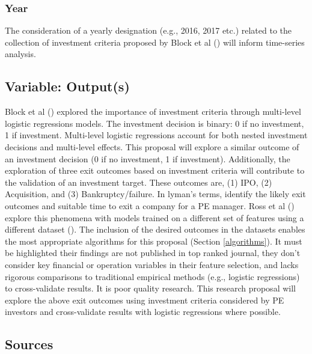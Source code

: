 \documentclass[12pt]{article}
\begin{document}
\subsubsection{Year}
The consideration of a yearly designation (e.g., 2016, 2017 etc.) related to the collection of investment criteria proposed by Block et al (\citeyear{BLOCK2019329}) will inform time-series analysis.
\subsection{Variable: Output(s)}
Block et al (\citeyear{BLOCK2019329}) explored the importance of investment criteria through multi-level logistic regressions models.
The investment decision is binary: 0 if no investment, 1 if investment. Multi-level logistic regressions account for both nested investment decisions and multi-level effects.
This proposal will explore a similar outcome of an investment decision (0 if no investment, 1 if investment).
Additionally, the exploration of three exit outcomes based on investment criteria will contribute to the validation of an investment target.
These outcomes are, (1) IPO, (2) Acquisition, and (3) Bankruptcy/failure.
In lyman's terms, identify the likely exit outcomes and suitable time to exit a company for a PE manager.
Ross et al (\citeyear{ross2021capitalvx}) explore this phenomena with models trained on a different set of features using a different dataset (\cite{CB}).
The inclusion of the desired outcomes in the datasets enables the most appropriate algorithms for this proposal (Section \ref{algorithms}).
It must be highlighted their findings are not published in top ranked journal, they don't consider key financial or operation variables in their feature selection,
and lacks rigorous comparisons to traditional empirical methods (e.g., logistic regressions) to cross-validate results. It is poor quality research.
This research proposal will explore the above exit outcomes using investment criteria considered by PE investors and cross-validate results with logistic regressions where possible.
\subsection{Sources}
\end{document}
